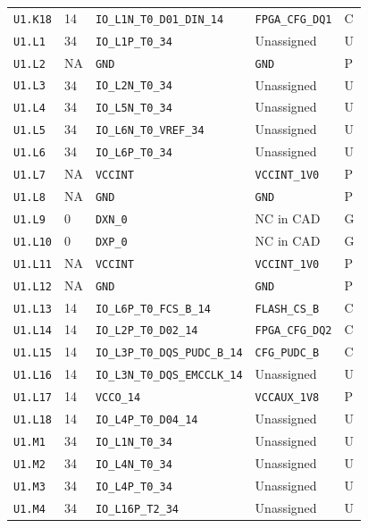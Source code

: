 \documentclass[11pt,a4paper]{article}
\begin{document}
\begin{longtable}{@{}P{20mm}P{10mm}P{70mm}P{51mm}P{11mm}@{}}
\nolinkurl{U1.K18} & 14 & \nolinkurl{IO_L1N_T0_D01_DIN_14} & \nolinkurl{FPGA_CFG_DQ1} & C \\
\nolinkurl{U1.L1} & 34 & \nolinkurl{IO_L1P_T0_34} & Unassigned & U \\
\nolinkurl{U1.L2} & NA & \nolinkurl{GND} & \nolinkurl{GND} & P \\
\nolinkurl{U1.L3} & 34 & \nolinkurl{IO_L2N_T0_34} & Unassigned & U \\
\nolinkurl{U1.L4} & 34 & \nolinkurl{IO_L5N_T0_34} & Unassigned & U \\
\nolinkurl{U1.L5} & 34 & \nolinkurl{IO_L6N_T0_VREF_34} & Unassigned & U \\
\nolinkurl{U1.L6} & 34 & \nolinkurl{IO_L6P_T0_34} & Unassigned & U \\
\nolinkurl{U1.L7} & NA & \nolinkurl{VCCINT} & \nolinkurl{VCCINT_1V0} & P \\
\nolinkurl{U1.L8} & NA & \nolinkurl{GND} & \nolinkurl{GND} & P \\
\nolinkurl{U1.L9} & 0 & \nolinkurl{DXN_0} & NC in CAD & G \\
\nolinkurl{U1.L10} & 0 & \nolinkurl{DXP_0} & NC in CAD & G \\
\nolinkurl{U1.L11} & NA & \nolinkurl{VCCINT} & \nolinkurl{VCCINT_1V0} & P \\
\nolinkurl{U1.L12} & NA & \nolinkurl{GND} & \nolinkurl{GND} & P \\
\nolinkurl{U1.L13} & 14 & \nolinkurl{IO_L6P_T0_FCS_B_14} & \nolinkurl{FLASH_CS_B} & C \\
\nolinkurl{U1.L14} & 14 & \nolinkurl{IO_L2P_T0_D02_14} & \nolinkurl{FPGA_CFG_DQ2} & C \\
\nolinkurl{U1.L15} & 14 & \nolinkurl{IO_L3P_T0_DQS_PUDC_B_14} & \nolinkurl{CFG_PUDC_B} & C \\
\nolinkurl{U1.L16} & 14 & \nolinkurl{IO_L3N_T0_DQS_EMCCLK_14} & Unassigned & U \\
\nolinkurl{U1.L17} & 14 & \nolinkurl{VCCO_14} & \nolinkurl{VCCAUX_1V8} & P \\
\nolinkurl{U1.L18} & 14 & \nolinkurl{IO_L4P_T0_D04_14} & Unassigned & U \\
\nolinkurl{U1.M1} & 34 & \nolinkurl{IO_L1N_T0_34} & Unassigned & U \\
\nolinkurl{U1.M2} & 34 & \nolinkurl{IO_L4N_T0_34} & Unassigned & U \\
\nolinkurl{U1.M3} & 34 & \nolinkurl{IO_L4P_T0_34} & Unassigned & U \\
\nolinkurl{U1.M4} & 34 & \nolinkurl{IO_L16P_T2_34} & Unassigned & U \\

\end{longtable}
\end{document}
